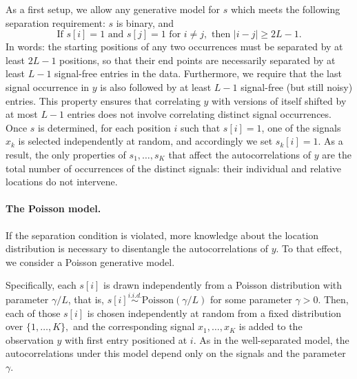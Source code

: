 \documentclass[12pt]{article}
\newcommand{\1}{\mathbf{1}}
\newcommand{\Poisson}{\text{Poisson}}
\theoremstyle{plain}
\theoremstyle{definition}
\theoremstyle{remark}
\theoremstyle{plain}
\theoremstyle{remark}
\theoremstyle{plain}
\theoremstyle{plain}
\theoremstyle{plain}
\numberwithin{equation}{section}
\begin{document}
As a first setup, we allow any generative model for $s$ which meets the following separation requirement: $s$ is binary, and
\begin{equation}
\textrm{If } s[i] = 1 \textrm{ and } s[j] = 1 \textrm{ for } i \neq j, \textrm{ then } |i - j| \geq 2L-1.
\label{eq:spacing}
\end{equation}
In words: the starting positions of any two occurrences  must be separated by at least $2L-1$ positions, so that their end points are necessarily separated by at least $L-1$ signal-free entries in the data.
Furthermore, we require that the last signal occurrence in $y$ is also followed by at least $L-1$ signal-free (but still noisy) entries.
This property ensures that correlating $y$ with versions of itself shifted by at most $L-1$ entries does not involve correlating distinct signal occurrences. Once $s$ is determined, for each position $i$ such that $s[i] = 1$, one of the signals $x_k$ is selected independently at random, and accordingly we set $s_k[i] = 1$. As a result, the only properties of $s_1, \ldots, s_K$ that affect the autocorrelations of $y$ are the total number of occurrences of the distinct signals: their individual and relative locations do not intervene.

\paragraph{The Poisson model.}

If the separation condition is violated, more knowledge about the location distribution is necessary to disentangle the autocorrelations of $y$. To that effect, we consider a Poisson generative model.

Specifically,  each $s[i]$ is drawn independently from a Poisson distribution with parameter $\gamma/L$, that is, ${s[i] \overset{i.i.d.}{\sim} \Poisson(\gamma / L)}$  for some parameter $\gamma > 0$. 
 Then, each of those $s[i]$ is chosen independently at random from a fixed distribution over $\{1,\ldots,K\},$ and the corresponding
signal $x_1, \ldots, x_K$ is added to the observation $y$ with first entry positioned at $i$. 
As in the well-separated model, the autocorrelations under this model depend only on the signals and the parameter $\gamma$.


%
%
\end{document}
